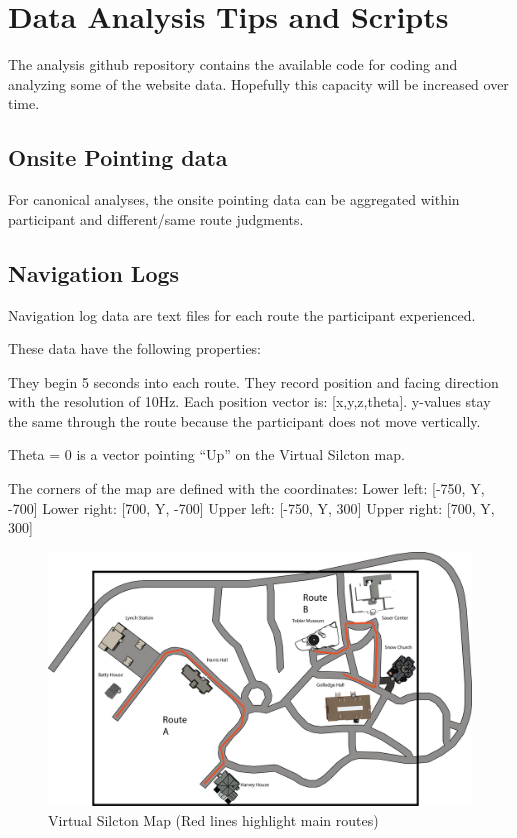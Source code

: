 \documentclass[
  12pt,
]{book}
\begin{document}
\hypertarget{data-analysis-tips-and-scripts}{%
\chapter{Data Analysis Tips and Scripts}\label{data-analysis-tips-and-scripts}}

The analysis github repository contains the available code for coding and analyzing some of the website data. Hopefully this capacity will be increased over time.

\hypertarget{onsite-pointing-data}{%
\section{Onsite Pointing data}\label{onsite-pointing-data}}

For canonical analyses, the onsite pointing data can be aggregated within participant and different/same route judgments.

\hypertarget{navigation-logs}{%
\section{Navigation Logs}\label{navigation-logs}}

Navigation log data are text files for each route the participant experienced.

These data have the following properties:

They begin 5 seconds into each route.
They record position and facing direction with the resolution of 10Hz.
Each position vector is: {[}x,y,z,theta{]}. y-values stay the same through the route because the participant does not move vertically.

Theta = 0 is a vector pointing ``Up'' on the Virtual Silcton map.

The corners of the map are defined with the coordinates:
Lower left: {[}-750, Y, -700{]}
Lower right: {[}700, Y, -700{]}
Upper left: {[}-750, Y, 300{]}
Upper right: {[}700, Y, 300{]}

\begin{figure}
\centering
\includegraphics{./figs/Silcton_Map.png}
\caption{Virtual Silcton Map (Red lines highlight main routes)}
\end{figure}
\end{document}
